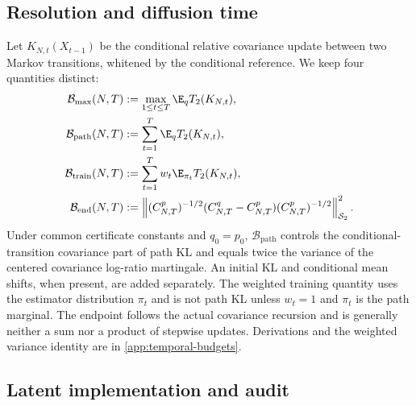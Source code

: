 \subsection{Resolution and diffusion time}
\label{sec:temporal-budgets}

Let $K_{N,t}(X_{t-1})$ be the conditional relative covariance update between two
Markov transitions, whitened by the conditional reference. We keep four
quantities distinct:
\begin{align}
  \mathcal B_{\max}(N,T)
    &:=\max_{1\le t\le T}\E_q\Ttwo(K_{N,t}),\label{eq:max-t2-budget}\\
  \mathcal B_{\mathrm{path}}(N,T)
    &:=\sum_{t=1}^T\E_q\Ttwo(K_{N,t}),\label{eq:path-t2-budget}\\
  \mathcal B_{\mathrm{train}}(N,T)
    &:=\sum_{t=1}^Tw_t\E_{\pi_t}\Ttwo(K_{N,t}),\label{eq:training-t2-budget}\\
  \mathcal B_{\mathrm{end}}(N,T)
    &:=\hsnorm{
      (C^p_{N,T})^{-1/2}(C^q_{N,T}-C^p_{N,T})(C^p_{N,T})^{-1/2}
    }^2.\label{eq:endpoint-t2-budget}
\end{align}
Under common certificate constants and $q_0=p_0$,
$\mathcal B_{\mathrm{path}}$ controls the conditional-transition covariance
part of path KL and equals twice the variance of the centered covariance
log-ratio martingale. An initial KL and conditional mean shifts, when present,
are added separately. The weighted
training quantity uses the estimator distribution $\pi_t$ and is not path KL
unless $w_t=1$ and $\pi_t$ is the path marginal. The endpoint follows the
actual covariance recursion and is generally neither a sum nor a product of
stepwise updates. Derivations and the weighted variance identity are in
\cref{app:temporal-budgets}.

\subsection{Latent implementation and audit}

